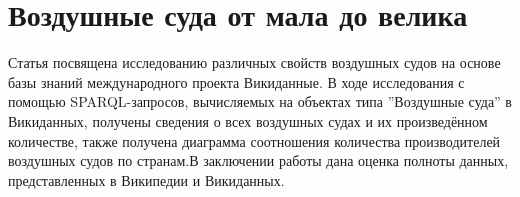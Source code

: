 \chapter{Воздушные суда от мала до велика}
\label{ch:aircraft-chapter}
\author{Потес Артём}

Статья посвящена исследованию различных свойств воздушных судов на основе базы знаний международного проекта Викиданные. В ходе исследования с помощью SPARQL-запросов, вычисляемых на объектах типа ”Воздушные суда” в Викиданных, получены сведения о всех воздушных судах и их произведённом количестве, также получена диаграмма соотношения количества производителей воздушных судов по странам.В заключении работы дана оценка полноты данных, представленных в Википедии и Викиданных.
